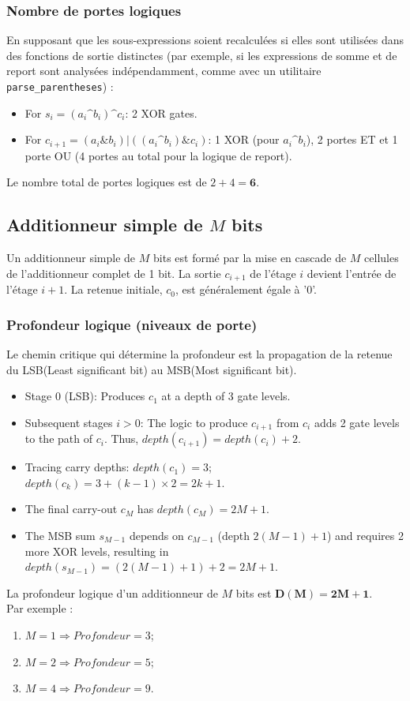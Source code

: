 \subsubsection{Nombre de portes logiques}
En supposant que les sous-expressions soient recalculées si elles sont utilisées dans des fonctions de sortie distinctes (par exemple, si les expressions de somme et de report sont analysées indépendamment, comme avec un utilitaire \texttt{parse\_parentheses}) :
\begin{itemize}
    \item For $s_i = (a_i \text{\textasciicircum} b_i) \text{\textasciicircum} c_i$: 2 XOR gates.
    \item For $c_{i+1} = (a_i \& b_i) | ((a_i \text{\textasciicircum} b_i) \& c_i)$: 1 XOR (pour $a_i \text{\textasciicircum} b_i$), 2 portes ET et 1 porte OU (4 portes au total pour la logique de report).
\end{itemize}
Le nombre total de portes logiques est de $2 + 4 = \textbf{6}$.

\subsection{Additionneur simple de $M$ bits}
Un additionneur simple de $M$ bits est formé par la mise en cascade de $M$ cellules de l'additionneur complet de 1 bit. La sortie $c_{i+1}$ de l'étage $i$ devient l'entrée de l'étage $i+1$. La retenue initiale, $c_0$, est généralement égale à  '0'.

\subsubsection{Profondeur logique (niveaux de porte)}
Le chemin critique qui détermine la profondeur est la propagation de la retenue du LSB(Least significant bit) au MSB(Most significant bit).
\begin{itemize}
    \item Stage 0 (LSB): Produces $c_1$ at a depth of 3 gate levels.
    \item Subsequent stages $i > 0$: The logic to produce $c_{i+1}$ from $c_i$ adds 2 gate levels to the path of $c_i$. Thus, $depth(c_{i+1}) = depth(c_i) + 2$.
    \item Tracing carry depths: $depth(c_1) = 3$; $depth(c_k) = 3 + (k-1) \times 2 = 2k + 1$.
    \item The final carry-out $c_M$ has $depth(c_M) = 2M + 1$.
    \item The MSB sum $s_{M-1}$ depends on $c_{M-1}$ (depth $2(M-1)+1$) and requires 2 more XOR levels, resulting in $depth(s_{M-1}) = (2(M-1)+1) + 2 = 2M+1$.
\end{itemize}
La profondeur logique d'un additionneur de $M$ bits est $\boldsymbol{D(M) = 2M + 1}$.\\
Par exemple :
\begin{enumerate}
    \item $M=1 \Rightarrow Profondeur=3$; 
    \item $M=2 \Rightarrow Profondeur=5$;
    \item $M=4 \Rightarrow Profondeur=9$.
\end{enumerate}


